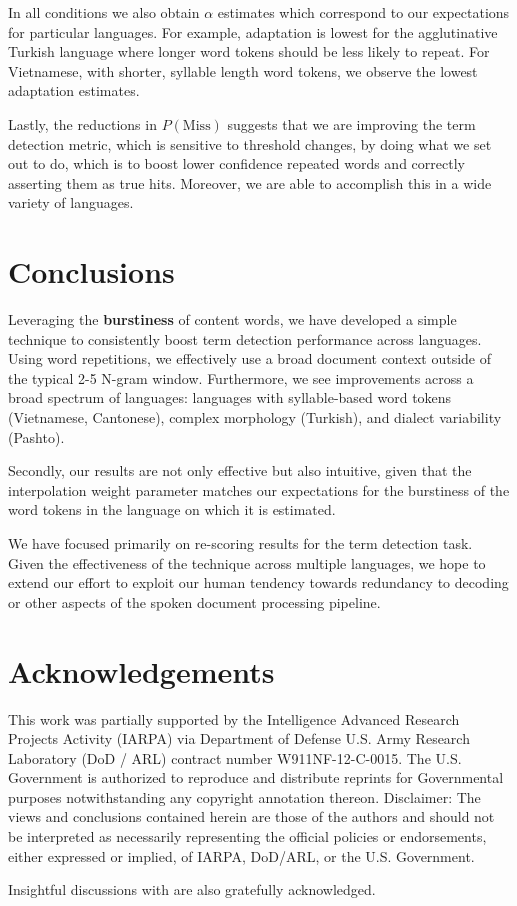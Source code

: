 \documentclass[11pt]{article}
\begin{document}
In all conditions we also obtain $\alpha$ estimates which correspond to our expectations for particular languages.  For example, adaptation is lowest for the agglutinative Turkish language where longer word tokens should be less likely to repeat.   For Vietnamese, with shorter, syllable length word tokens, we observe the lowest adaptation estimates.

Lastly, the reductions in $P(\mathrm{Miss})$ suggests that we are improving the term detection metric, which is sensitive to threshold changes, by doing what we set out to do, which is to boost lower confidence repeated words and correctly asserting them as true hits.  Moreover, we are able to accomplish this in a wide variety of languages.

\section{Conclusions}
Leveraging the \textbf{burstiness} of content words, we have developed a simple technique to consistently boost term detection performance across languages.  Using word repetitions, we effectively use a broad document context outside of the typical 2-5 N-gram window.  Furthermore, we see improvements across a broad spectrum of languages: languages with syllable-based word tokens (Vietnamese, Cantonese), complex morphology (Turkish), and dialect variability (Pashto). 

Secondly, our results are not only effective but also intuitive, given that the interpolation weight parameter matches our expectations for the burstiness of the word tokens in the language on which it is estimated.

We have focused primarily on re-scoring results for the term detection task.  Given the effectiveness of the technique across multiple languages, we hope to extend our effort to exploit our human tendency towards redundancy to decoding or other aspects of the spoken document processing pipeline.

\section*{Acknowledgements}
This work was partially supported by the Intelligence Advanced Research Projects Activity (IARPA) via Department of Defense U.S. Army Research Laboratory (DoD / ARL) contract number W911NF-12-C-0015. The U.S. Government is authorized to reproduce and distribute reprints for Governmental purposes notwithstanding any copyright annotation thereon. Disclaimer: The views and conclusions contained herein are those of the authors and should not be interpreted as necessarily representing the official policies or endorsements, either expressed or implied, of IARPA, DoD/ARL, or the U.S. Government.

Insightful discussions with  are also gratefully acknowledged.




\end{document}
